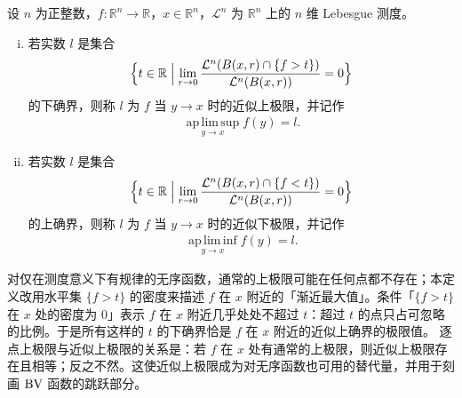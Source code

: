 \documentclass[../../main.tex]{subfiles}%
\begin{document}
\begin{definition}[近似上极限与近似下极限]\label{definition:ch01-1-28}
设 $n$ 为正整数，$f:\mathbb{R}^n\to\mathbb{R}$，$x\in\mathbb{R}^n$，$\mathcal{L}^{n}$ 为 $\mathbb{R}^n$ 上的 $n$ 维 Lebesgue 测度。
\begin{enumerate}[(i)]
\item 若实数 $l$ 是集合
\begin{align*}
\Bigl\{t\in\mathbb{R}\Bigm|\lim_{r\to0}\frac{\mathcal{L}^{n}(B(x,r)\cap\{f>t\})}{\mathcal{L}^{n}(B(x,r))}=0\Bigr\}
\end{align*}
的下确界，则称 $l$ 为 $f$ 当 $y\to x$ 时的近似上极限，并记作
\begin{align*}
\operatorname*{ap\,lim\,sup}_{y\to x}f(y)=l .
\end{align*}
\item 若实数 $l$ 是集合
\begin{align*}
\Bigl\{t\in\mathbb{R}\Bigm|\lim_{r\to0}\frac{\mathcal{L}^{n}(B(x,r)\cap\{f<t\})}{\mathcal{L}^{n}(B(x,r))}=0\Bigr\}
\end{align*}
的上确界，则称 $l$ 为 $f$ 当 $y\to x$ 时的近似下极限，并记作
\begin{align*}
\operatorname*{ap\,lim\,inf}_{y\to x}f(y)=l .
\end{align*}
\end{enumerate}
\end{definition}

\begin{remark}\label{remark:ch01-def-1-28-动机}
对仅在测度意义下有规律的无序函数，通常的上极限可能在任何点都不存在；本定义改用水平集 $\{f>t\}$ 的密度来描述 $f$ 在 $x$ 附近的「渐近最大值」。条件「$\{f>t\}$ 在 $x$ 处的密度为 $0$」表示 $f$ 在 $x$ 附近几乎处处不超过 $t$：超过 $t$ 的点只占可忽略的比例。于是所有这样的 $t$ 的下确界恰是 $f$ 在 $x$ 附近的近似上确界的极限值。%
逐点上极限与近似上极限的关系是：若 $f$ 在 $x$ 处有通常的上极限，则近似上极限存在且相等；反之不然。这使近似上极限成为对无序函数也可用的替代量，并用于刻画 $\mathrm{BV}$ 函数的跳跃部分。
\end{remark}
\end{document}
